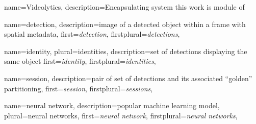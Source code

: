 
{
    name=Videolytics,
    description={Encapsulating system this work is module of}
}

{
    name=detection,
    description={image of a detected object within a frame with spatial metadata},
    first=\emph{detection},
    firstplural=\emph{detections},
}

{
    name=identity,
    plural=identities,
    description={set of detections displaying the same object}
    first=\emph{identity},
    firstplural=\emph{identities},
}

{
    name=session,
    description={pair of set of detections and its associated ``golden'' partitioning},
    first=\emph{session},
    firstplural=\emph{sessions},
}


{
    name={neural network},
    description={popular machine learning model},
    plural={neural networks},
    first=\emph{neural network},
    firstplural=\emph{neural networks},
}


